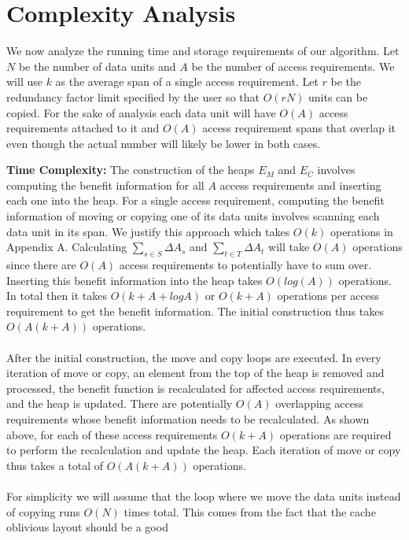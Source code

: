 \section{Complexity Analysis}

We now analyze the running time and storage requirements of our algorithm. Let
$N$ be the number of data units and $A$ be the number of access requirements.
We will use $k$ as the average span of a single access requirement. Let $r$ be the redundancy factor limit specified by the user so that $O(rN)$ units can be copied. For the sake of analysis each data unit will have $O(A)$ access requirements attached to it and $O(A)$ access requirement spans that overlap it even though the actual number will likely be lower in both cases. 

{\bf Time Complexity:} The construction of the heaps $E_M$ and $E_C$ involves
computing the benefit information for all $A$ access requirements and inserting
each one into the heap. For a single access requirement, computing the benefit information of moving or copying one of its data units involves scanning each data unit in its span. We justify
this approach which takes $O(k)$ operations in Appendix A. Calculating $\sum_{s\in S}\Delta{A_s}$ and $\sum_{t\in T}\Delta{A_t}$ will take $O(A)$ operations since there are $O(A)$ access requirements to potentially have to sum over. Inserting this
benefit information into the heap takes $O(log (A))$ operations. In total then it takes $O(k + A + logA)$ or $O(k + A)$ operations per access requirement to get the benefit information. The initial construction thus takes $O(A(k+A))$ operations. \\
\\
After the initial construction, the move and copy loops are executed. In every iteration of move or copy, an element from the top of the heap is removed and processed, the benefit function is recalculated for affected access requirements, and the heap is updated. There are potentially $O(A)$ overlapping access requirements whose benefit information needs to be recalculated. As shown above, for each of these access requirements $O(k+A)$ operations are required to perform the recalculation and update the heap. Each iteration of move or copy thus takes a total of $O(A(k+A))$ operations.\\
\\
For simplicity we will assume that the loop where we move the data units
instead of copying runs $O(N)$ times total. This comes from the fact that the
cache oblivious layout \cite{cacheobliviouslayout} should be a good

